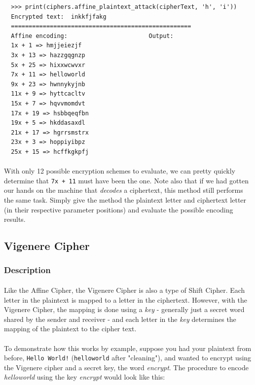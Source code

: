 \documentclass[12pt,a4paper]{article}
\begin{document}
\begin{verbatim}
  >>> print(ciphers.affine_plaintext_attack(cipherText, 'h', 'i'))
  Encrypted text:  inkkfjfakg
  ===================================================
  Affine encoding:                       Output:
  1x + 1 => hmjjeiezjf
  3x + 13 => hazzgqgnzp
  5x + 25 => hixxwcwvxr
  7x + 11 => helloworld
  9x + 23 => hwnnykyjnb
  11x + 9 => hyttcacltv
  15x + 7 => hqvvmomdvt
  17x + 19 => hsbbqeqfbn
  19x + 5 => hkddasaxdl
  21x + 17 => hgrrsmstrx
  23x + 3 => hoppiyibpz
  25x + 15 => hcffkgkpfj
\end{verbatim}

\paragraph{}
With only 12 possible encryption schemes to evaluate, we can pretty quickly 
determine that \verb|7x + 11| must have been the one.  Note also that if we 
had gotten our hands on the machine that \textit{decodes} a ciphertext, this 
method still performs the same task.  Simply give the method the plaintext 
letter and ciphertext letter (in their respective parameter positions) and 
evaluate the possible encoding results.


\subsection{Vigenere Cipher}
\subsubsection{Description}
\paragraph{}
Like the Affine Cipher, the Vigenere Cipher is also a type of Shift Cipher.  
Each letter in the plaintext is mapped to a letter in the ciphertext.  
However, with the Vigenere Cipher, the mapping is done using a \textit{key} - 
generally just a secret word shared by the sender and receiver - and 
each letter in the \textit{key} determines the mapping of the plaintext to the 
cipher text.

\paragraph{}
To demonstrate how this works by example, suppose you had your plaintext from 
before, \verb|Hello World!| (\verb|helloworld| after "cleaning"), and 
wanted to encrypt using the Vigenere cipher and a secret key, the word 
\textit{encrypt}.  The procedure to encode \textit{helloworld} using the key 
\textit{encrypt} would look like this:
\end{document}
